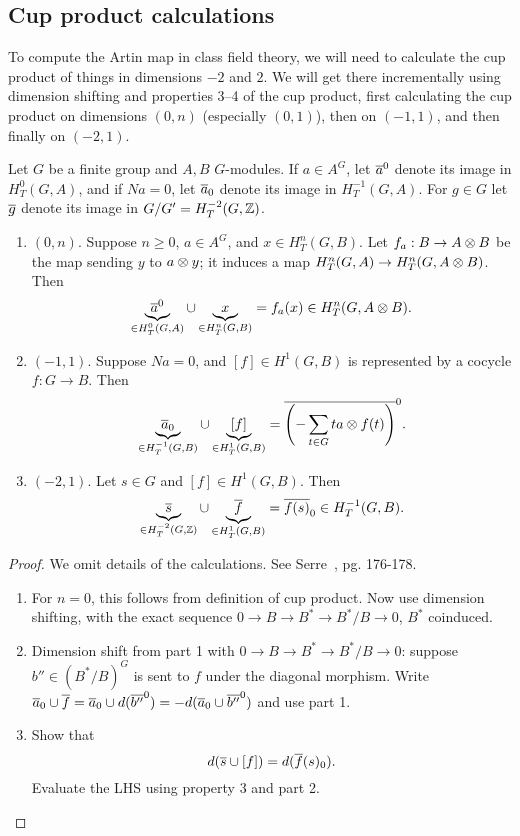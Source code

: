 \subsection{Cup product calculations}
To compute the Artin map in class field theory, we will need to calculate the cup product of things in dimensions $-2$ and $2$. We will get there incrementally using dimension shifting and properties 3--4 of the cup product, first calculating the cup product on dimensions $(0,n)$ (especially $(0,1)$), then on $(-1,1)$, and then finally on $(-2,1)$. %
\begin{thm}
Let $G$ be a finite group and $A,B$ $G$-modules. If $a\in A^G$, let $\overline{a}^0$ denote its image in $H_T^0(G,A)$, and if $Na=0$, let $\overline{a}_0$ denote its image in $H_T^{-1}(G,A)$. For $g\in G$ let $\overline{g}$ denote its image in $G/G'=H_T^{-2}(G,\mathbb{Z})$.
\begin{enumerate}
\item $(0,n)$. Suppose $n\ge 0$, $a\in A^G$, %
and $x\in H_T^n(G,B)$. Let $f_a:B\to A\otimes B$ be the map sending $y$ to $a\otimes y$; it induces a map $H_T^n(G,A)\to H_T^n(G,A\otimes B)$. Then
\[
\underbrace{\overline{a}^0}_{\in H_T^0(G,A)}\cup \underbrace{x}_{\in H_T^n(G,B)}=f_a(x)\in H_T^n(G,A\otimes B).
\]
\item $(-1,1)$. Suppose $Na=0$, and $[f]\in H^1(G,B)$ is represented by a cocycle $f:G\to B$. Then
\[
\underbrace{\overline{a}_0}_{\in H_T^{-1}(G,B)}\cup \underbrace{[f]}_{\in H_T^{1}(G,B)} = \overline{\left( {-\sum_{t\in G} ta\otimes f(t)} \right)}^0.
\]
\item $(-2,1)$. Let $s\in G$ and $[f]\in H^1(G,B)$. Then
\[
\underbrace{\overline{s}}_{\in H_T^{-2}(G,\mathbb{Z})}\cup \underbrace{\overline{f}}_{\in H_T^1(G,B)}=\overline{f(s)}_0\in H_T^{-1}(G,B).
\]
\end{enumerate}
\begin{proof}
We omit details of the calculations. See Serre~\cite{Se79}, pg. 176-178.
\begin{enumerate}
\item
For $n=0$, this follows from definition of cup product. Now use dimension shifting, with the exact sequence $0\to B\to B^*\to B^*/B\to 0$, $B^*$ coinduced.
\item
Dimension shift from part 1 with $0\to B\to B^*\to B^*/B\to 0$: suppose $b''\in (B^*/B)^G$ is sent to $f$ under the diagonal morphism. Write $\overline{a}_0\cup \overline{f}=\overline{a}_0\cup d(\overline{b''}^0)=-d(\overline{a}_0\cup \overline{b''}^0)$ and use part 1.
\item
Show that
\[
d(\overline{s}\cup [f])=d(\overline{f}(s)_0).
\]
Evaluate the LHS using property 3 and part 2.
\end{enumerate}
\end{proof}
\end{thm}
